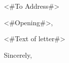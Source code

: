\documentclass[12pt,letterpaper]{scrlttr2}
\begin{document}
\begin{letter}{<#To Address#>}
\opening{<#Opening#>,}

<#Text of letter#>


\closing{Sincerely,}
\end{letter}
\end{document}
